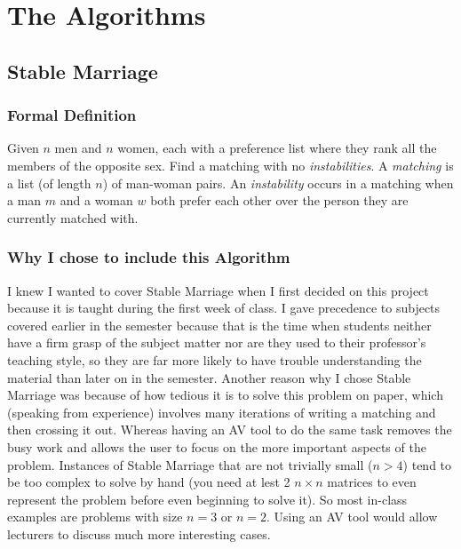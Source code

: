 \chapter{The Algorithms} 
\label{the-algorithms}
\section{Stable Marriage}
%
\subsection{Formal Definition}
Given $n$ men and $n$ women, 
each with a preference list where they rank all the members of the opposite sex. 
Find a matching with no \textit{instabilities}. 
\newline\newline
A \textit{matching} is a list (of length $n$) of man-woman pairs.
An \textit{instability} occurs in a matching when 
a man $m$ and a woman $w$ both prefer each other over the person they are currently matched with. 
%
\subsection{Why I chose to include this Algorithm}
\hspace{-0.26in}
I knew I wanted to cover Stable Marriage when I first decided on this project
because it is taught during the first week of class.
I gave precedence to subjects covered earlier in the semester 
because that is the time when students neither have a firm grasp of the subject matter 
nor are they used to their professor's teaching style, 
so they are far more likely to have trouble understanding the material
than later on in the semester. 
\newline\newline
Another reason why I chose Stable Marriage was because of how tedious it is to 
solve this problem on paper, which (speaking from experience) involves many iterations of 
writing a matching and then crossing it out. 
Whereas having an AV tool to do the same task removes the busy work and allows 
the user to focus on the more important aspects of the problem.
\newline\newline
Instances of Stable Marriage that are not trivially small ($n > 4$) 
tend to be too complex to solve by hand 
(you need at lest 2 $n\times n$ matrices to even represent the problem
before even beginning to solve it). 
So most in-class examples are problems with size $n = 3$ or $n = 2$.
Using an AV tool would allow lecturers to discuss much more interesting cases. 
%
